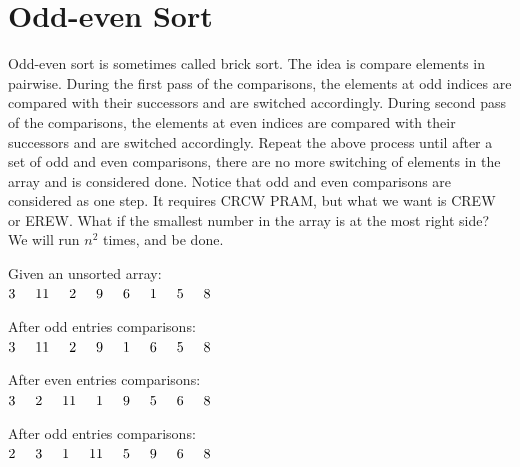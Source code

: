 \documentclass[twoside]{article}
\begin{document}
\section{Odd-even Sort}
Odd-even sort is sometimes called brick sort. The idea is compare elements in pairwise. During the first pass of the comparisons, the elements at odd indices are compared with their successors and are switched accordingly. During second pass of the comparisons, the elements at even indices are compared with their successors and are switched accordingly. Repeat the above process until after a set of odd and even comparisons, there are no more switching of elements in the array and is considered done. Notice that odd and even comparisons are considered as one step. It requires CRCW PRAM, but what we want is CREW or EREW. What if the smallest number in the array is at the most right side? We will run $n^2$ times, and be done. 

Given an unsorted array: \\
$3\hspace{0.5cm}11\hspace{0.5cm}2\hspace{0.5cm}9\hspace{0.5cm}6\hspace{0.5cm}1\hspace{0.5cm}5\hspace{0.5cm}8$

After odd entries comparisons: \\
$3\hspace{0.5cm}11\hspace{0.5cm}2\hspace{0.5cm}9\hspace{0.5cm}1\hspace{0.5cm}6\hspace{0.5cm}5\hspace{0.5cm}8$

After even entries comparisons: \\
$3\hspace{0.5cm}2\hspace{0.5cm}11\hspace{0.5cm}1\hspace{0.5cm}9\hspace{0.5cm}5\hspace{0.5cm}6\hspace{0.5cm}8$

After odd entries comparisons: \\
$2\hspace{0.5cm}3\hspace{0.5cm}1\hspace{0.5cm}11\hspace{0.5cm}5\hspace{0.5cm}9\hspace{0.5cm}6\hspace{0.5cm}8$
\end{document}
